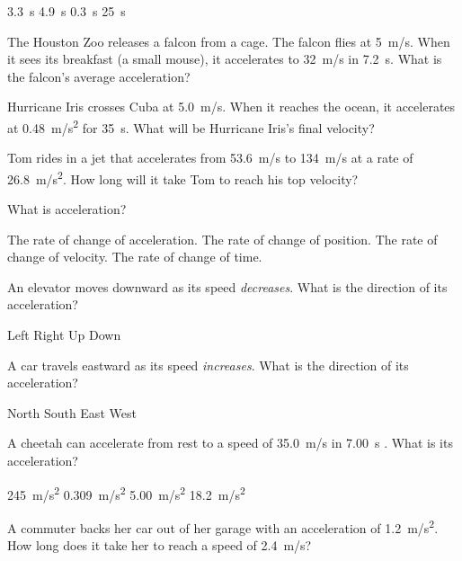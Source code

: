 \documentclass{exam}
\begin{document}
\begin{questions}
\begin{choices}
    \correctchoice \SI{3.3}{s}
    \choice \SI{4.9}{s}
    \choice \SI{0.3}{s}
    \choice \SI{25}{s}
\end{choices}

\clearpage
\question
The Houston Zoo releases a falcon from a cage. The falcon flies at \SI{5}{m/s}. When it sees its breakfast (a small mouse), it accelerates to \SI{32}{m/s} in \SI{7.2}{s}. What is the falcon's average acceleration?

\question
Hurricane Iris crosses Cuba at \SI{5.0}{m/s}. When it reaches the ocean, it accelerates at \SI{0.48}{m/s^2} for \SI{35}{s}. What will be Hurricane Iris's final velocity?

\question 
Tom rides in a jet that accelerates from \SI{53.6}{m/s} to \SI{134}{m/s} at a rate of \SI{26.8}{m/s^2}. How long will it take Tom to reach his top velocity?


\question
What is acceleration?

\begin{choices}
\choice The rate of change of acceleration.
\choice The rate of change of position. 
\CorrectChoice The rate of change of velocity.
\choice The rate of change of time.
\end{choices}

\question %
An elevator moves downward as its speed \textit{decreases}. What is the direction of its acceleration?

\begin{choices}
\choice Left
\choice Right 
\correctchoice Up
\choice Down
\end{choices}

\question %
A car travels eastward as its speed \textit{increases}. What is the direction of its acceleration?

\begin{choices}
\choice North
\choice South 
\correctchoice East
\choice West
\end{choices}


\question %
A cheetah can accelerate from rest to a speed of 
\SI{35.0}{m/s}
in 
\SI{7.00}{s}
. What is its acceleration?

\begin{choices}
\choice \SI{245}{m/s^2}
\choice \SI{0.309}{m/s^2}
\CorrectChoice \SI{5.00}{m/s^2}
\choice \SI{18.2}{m/s^2}
\end{choices}

\question %
A commuter backs her car out of her garage with an acceleration of \SI{1.2}{m/s^2}. How long does it take her to reach a speed of \SI{2.4}{m/s}?


\end{questions}
\end{document}

